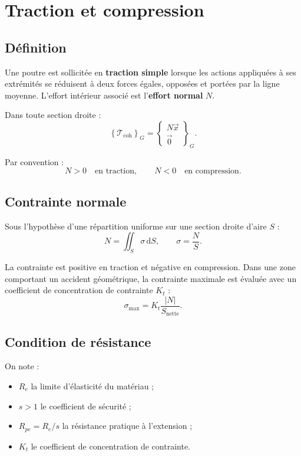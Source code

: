 
\section{Traction et compression}
\label{sec:rdm-5}

\subsection{Définition}

Une poutre est sollicitée en \textbf{traction simple} lorsque les actions appliquées à ses extrémités se réduisent à deux forces égales, opposées et portées par la ligne moyenne. L'effort intérieur associé est l'\textbf{effort normal} $N$.

\TLDiagrammeTraction

Dans toute section droite :
\[
\left\{\mathcal T_{\mathrm{coh}}\right\}_G
=\left\{\begin{array}{c}N\vec x\\\vec0\end{array}\right\}_G.
\]

Par convention :
\[
N>0\quad\text{en traction},
\qquad
N<0\quad\text{en compression}.
\]

\subsection{Contrainte normale}

Sous l'hypothèse d'une répartition uniforme sur une section droite d'aire $S$ :
\[
N=\iint_S\sigma\,\mathrm dS,
\qquad
\boxed{\sigma=\frac{N}{S}.}
\]

La contrainte est positive en traction et négative en compression. Dans une zone comportant un accident géométrique, la contrainte maximale est évaluée avec un coefficient de concentration de contrainte $K_t$ :
\[
\sigma_{\max}=K_t\frac{|N|}{S_{\mathrm{nette}}}.
\]

\subsection{Condition de résistance}

On note :
\begin{itemize}
  \item $R_e$ la limite d'élasticité du matériau ;
  \item $s>1$ le coefficient de sécurité ;
  \item $R_{pe}=R_e/s$ la résistance pratique à l'extension ;
  \item $K_t$ le coefficient de concentration de contrainte.
\end{itemize}


